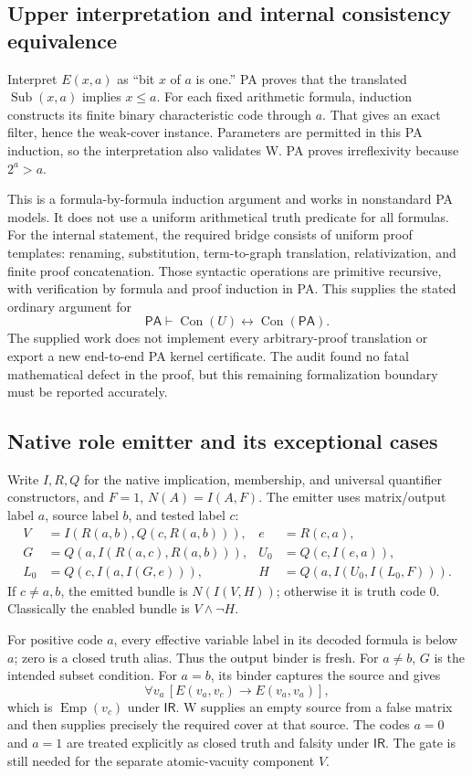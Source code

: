 \documentclass[11pt,a4paper]{article}
\newcommand{\PA}{\mathsf{PA}}
\newcommand{\Con}{\operatorname{Con}}
\newcommand{\Sub}{\operatorname{Sub}}
\newcommand{\IR}{\mathsf{IR}}
\newcommand{\Emp}{\operatorname{Emp}}
\begin{document}
\subsection{Upper interpretation and internal consistency equivalence}

Interpret $E(x,a)$ as ``bit $x$ of $a$ is one.'' PA proves that the translated
$\Sub(x,a)$ implies $x\leq a$. For each fixed arithmetic formula, induction
constructs its finite binary characteristic code through $a$. That gives
an exact filter, hence the weak-cover instance. Parameters are permitted in
this PA induction, so the interpretation also validates W. PA proves
irreflexivity because $2^a>a$.

This is a formula-by-formula induction argument and works in nonstandard
PA models. It does not use a uniform arithmetical truth predicate for all
formulas. For the internal statement, the required bridge consists of
uniform proof templates: renaming, substitution, term-to-graph translation,
relativization, and finite proof concatenation. Those syntactic operations
are primitive recursive, with verification by formula and proof induction
in PA. This supplies the stated ordinary argument for
\[
\PA\vdash\Con(U)\leftrightarrow\Con(\PA).
\]
The supplied work does not implement every arbitrary-proof translation or
export a new end-to-end PA kernel certificate. The audit found no fatal
mathematical defect in the proof, but this remaining formalization boundary
must be reported accurately.

\subsection{Native role emitter and its exceptional cases}

Write $I,R,Q$ for the native implication, membership, and universal
quantifier constructors, and $F=1$, $N(A)=I(A,F)$. The emitter uses
matrix/output label $a$, source label $b$, and tested label $c$:
\begin{align*}
V&=I(R(a,b),Q(c,R(a,b))), & e&=R(c,a),\\
G&=Q(a,I(R(a,c),R(a,b))), & U_0&=Q(c,I(e,a)),\\
L_0&=Q(c,I(a,I(G,e))), & H&=Q(a,I(U_0,I(L_0,F))).
\end{align*}
If $c\ne a,b$, the emitted bundle is $N(I(V,H))$; otherwise it is truth
code 0. Classically the enabled bundle is $V\land\neg H$.

For positive code $a$, every effective variable label in its decoded
formula is below $a$; zero is a closed truth alias. Thus the output binder
is fresh. For $a\ne b$, $G$ is the intended subset condition. For $a=b$,
its binder captures the source and gives
\[
\forall v_a\,[E(v_a,v_c)\to E(v_a,v_a)],
\]
which is $\Emp(v_c)$ under $\IR$. W supplies an empty source from a false
matrix and then supplies precisely the required cover at that source.
The codes $a=0$ and $a=1$ are treated explicitly as closed truth and falsity
under $\IR$. The gate is still needed for the separate atomic-vacuity
component $V$.
\end{document}

